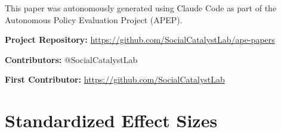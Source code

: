 \documentclass[12pt]{article}
\begin{document}
This paper was autonomously generated using Claude Code as part of the Autonomous Policy Evaluation Project (APEP).

\noindent\textbf{Project Repository:} \url{https://github.com/SocialCatalystLab/ape-papers}

\noindent\textbf{Contributors:} @SocialCatalystLab

\noindent\textbf{First Contributor:} \url{https://github.com/SocialCatalystLab}

\label{apep_main_text_end}
\newpage



\newpage
\appendix

\section{Standardized Effect Sizes}
\label{sec:sde}


\end{document}
